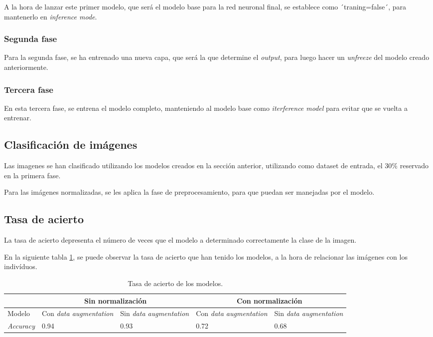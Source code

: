 A la hora de lanzar este primer modelo, que será el modelo base para la red neuronal final, se establece como  ´traning=false´, para mantenerlo en \textit{inference mode}.


\subsubsection{Segunda fase}

Para la segunda fase, se ha entrenado una nueva capa, que será la que determine el \textit{output}, para luego hacer un \textit{unfreeze} del modelo creado anteriormente.

\subsubsection{Tercera fase}

En esta tercera fase, se entrena el modelo completo, manteniendo al modelo base como \textit{iterference model} para evitar que se vuelta a entrenar.


\subsection{Clasificación de imágenes}

Las imagenes se han clasificado utilizando los modelos creados en la sección anterior, utilizando como dataset de entrada, el 30\% reservado en la primera fase. 

Para las imágenes normalizadas, se les aplica la fase de preprocesamiento, para que puedan ser manejadas por el modelo. 

\subsection{Tasa de acierto} 

La tasa de acierto depresenta el número de veces que el modelo a determinado correctamente la clase de la imagen. 

En la siguiente tabla \ref{tabla:tasa-acierto-modelos}, se puede observar la tasa de acierto que han tenido los modelos, a la hora de relacionar las imágenes
 con los indivíduos.

\begin{table}[h!]
\begin{tabular}{ |p{2cm}||p{2cm}|p{2cm}|p{2cm}|p{2cm}|  }
    \hline
     & \multicolumn{2}{|c|}{Sin normalización} & \multicolumn{2}{|c|}{Con normalización} \\
    \hline
    Modelo& Con \textit{data augmentation} & Sin \textit{data augmentation} &Con \textit{data augmentation}&Sin \textit{data augmentation}\\
    \hline
    \textit{Accuracy} & 0.94   & 0.93    & 0.72 &   0.68\\
    \hline
   \end{tabular}
   \caption{\label{tabla:tasa-acierto-modelos}Tasa de acierto de los modelos.}
\end{table}


